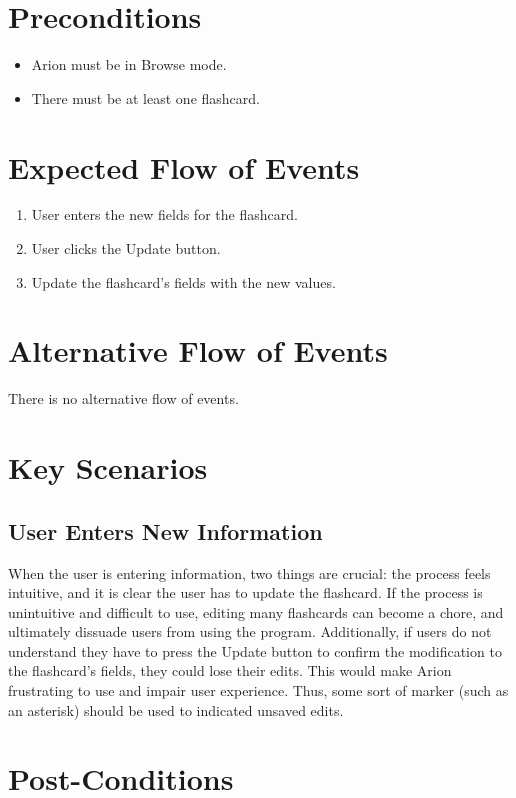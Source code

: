 \documentclass{scrreprt}
\begin{document}
\section{Preconditions}
\begin{itemize}
    \item Arion must be in Browse mode.
    \item There must be at least one flashcard.
\end{itemize}

\section{Expected Flow of Events}
\begin{enumerate}[1.]
    \item User enters the new fields for the flashcard.
    \item User clicks the Update button.
    \item Update the flashcard's fields with the new values.
\end{enumerate}

\section{Alternative Flow of Events}
    There is no alternative flow of events.

\section{Key Scenarios}
    \subsection{User Enters New Information}
    When the user is entering information, two things are crucial:
    the process feels intuitive, and it is clear the user has to update the flashcard.
    If the process is unintuitive and difficult to use,
    editing many flashcards can become a chore,
    and ultimately dissuade users from using the program.
    Additionally, if users do not understand they have to press the Update button to
    confirm the modification to the flashcard's fields, they could lose their edits.
    This would make Arion frustrating to use and impair user experience.
    Thus, some sort of marker (such as an asterisk) should be used to indicated
    unsaved edits.

\section{Post-Conditions}
\end{document}
